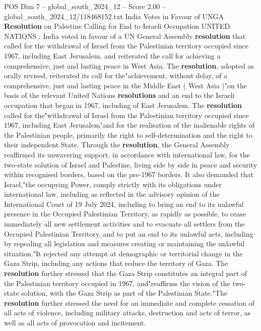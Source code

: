 \begin{textsample}{POS Dim 7 – global\_south\_2024\_12 – Score 2.00 – global\_south\_2024\_12/118468152.txt}  \label{ex:f7_pos_154}
India Votes in Favour of UNGA \textbf{Resolution} on Palestine Calling for End to Israeli Occupation UNITED NATIONS : India voted in favour of a UN General Assembly \textbf{resolution} that called for the withdrawal of Israel from the Palestinian territory occupied since 1967, including East Jerusalem, and reiterated the call for achieving a comprehensive, just and lasting peace in West Asia.
The \textbf{resolution}, adopted as orally revised, reiterated its call for the"achievement, without delay, of a comprehensive, just and lasting peace in the Middle East ( West Asia )"on the basis of the relevant United Nations \textbf{resolutions} and an end to the Israeli occupation that began in 1967, including of East Jerusalem.
The \textbf{resolution} called for the"withdrawal of Israel from the Palestinian territory occupied since 1967, including East Jerusalem"and for the realisation of the inalienable rights of the Palestinian people, primarily the right to self-determination and the right to their independent State.
Through the \textbf{resolution}, the General Assembly reaffirmed its unwavering support, in accordance with international law, for the two-state solution of Israel and Palestine, living side by side in peace and security within recognised borders, based on the pre-1967 borders.
It also demanded that Israel,"the occupying Power, comply strictly with its obligations under international law, including as reflected in the advisory opinion of the International Court of 19 July 2024, including to bring an end to its unlawful presence in the Occupied Palestinian Territory, as rapidly as possible, to cease immediately all new settlement activities and to evacuate all settlers from the Occupied Palestinian Territory, and to put an end to its unlawful acts, including by repealing all legislation and measures creating or maintaining the unlawful situation."It rejected any attempt at demographic or territorial change in the Gaza Strip, including any actions that reduce the territory of Gaza.
The \textbf{resolution} further stressed that the Gaza Strip constitutes an integral part of the Palestinian territory occupied in 1967, and"reaffirms the vision of the two-state solution, with the Gaza Strip as part of the Palestinian State."The \textbf{resolution} further stressed the need for an immediate and complete cessation of all acts of violence, including military attacks, destruction and acts of terror, as well as all acts of provocation and incitement.

\end{textsample}
